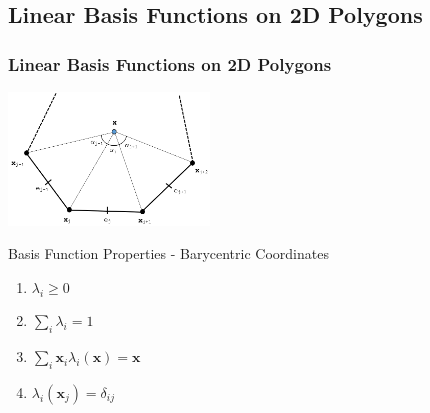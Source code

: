 \documentclass[compress,10pt]{beamer}
\renewcommand{\vec}[1]{\mathbf{#1}}
\begin{document}
\subsection{Linear Basis Functions on 2D Polygons}
\typeout{***********************************************************************************}
\begin{frame}[t]\frametitle{Linear Basis Functions on 2D Polygons}
\centering
\includegraphics[width=0.40\textwidth]{images/ref_polygon.png}
\vspace{0.75cm}
\begin{block}{Basis Function Properties - Barycentric Coordinates}
	\begin{enumerate}
	\item $\lambda_i \geq 0$
	\item $\sum_i \lambda_i = 1$
	\item $\sum_i \vec{x}_i \lambda_i (\vec{x}) = \vec{x}$
	\item $\lambda_i (\vec{x}_j) = \delta_{ij}$
	\end{enumerate}
\end{block}
\end{frame}
\end{document}
